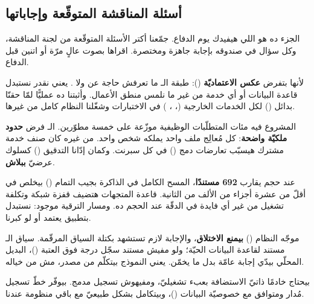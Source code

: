 \subsection{أسئلة المناقشة المتوقّعة وإجاباتها}

الجزء ده هو اللي هيفيدك يوم الدفاع. جمّعنا أكتر الأسئلة المتوقّعة من لجنة المناقشة،
وكل سؤال في صندوقه بإجابة جاهزة ومختصرة. اقراها بصوت عالٍ مرّة أو اتنين قبل الدفاع.

\begin{qa}
لأنها بتفرض \textbf{عكس الاعتماديّة} (): طبقة الـ
ما تعرفش حاجة عن  ولا . يعني نقدر نستبدل قاعدة البيانات أو
أي خدمة من غير ما نلمس منطق الأعمال. وأثبتنا ده عمليًّا لمّا حقنّا بدائل
() لكل الخدمات الخارجية (، ، ) في الاختبارات
وشغّلنا النظام كامل من غيرها.
\end{qa}

\begin{qa}
المشروع فيه مئات المتطلّبات الوظيفية موزّعة على خمسة مطوّرين. الـ فرض
\textbf{حدود ملكيّة واضحة}: كل مُعالِج ملف  واحد يملكه شخص واحد. من غيره
كان صنف خدمة مشترك هيسبّب تعارضات دمج () في كل سبرنت. وكمان
 إدّانا التدقيق () كسلوك عرضيّ \textbf{ببلاش}.
\end{qa}

\begin{qa}
عند حجم يقارب \textbf{692 مستندًا}، المسح الكامل في الذاكرة بجيب التمام
() بيخلص في أقلّ من عشرة أجزاء من الألف من الثانية. قاعدة المتجهات
هتضيف قفزة شبكة وتكلفة تشغيل من غير أي فايدة في الدقّة عند الحجم ده. ومسار الترقية
موجود: نستبدل  بتطبيق يعتمد  أو 
لو كبرنا.
\end{qa}

\begin{qa}
موجّه النظام () \textbf{بيمنع الاختلاق}، والإجابة لازم تستشهد
بكتلة السياق المرقّمة. سياق الـ مستند لقاعدة البيانات الحيّة؛ ولو مفيش
مستند سجّل درجة فوق العتبة ()، البديل المحلّي بيدّي إجابة عامّة بدل ما
يخمّن. يعني النموذج بيتكلّم من مصدر، مش من خياله.
\end{qa}

\begin{qa}
 بيحتاج خادمًا ذاتيّ الاستضافة بعبء تشغيليّ، ومفيهوش  تسجيل
مدمج.  بيوفّر خطّ تسجيل مُدار ومتوافق مع خصوصيّة البيانات
()، وبيتكامل بشكل طبيعيّ مع باقي منظومة  عندنا.
\end{qa}

